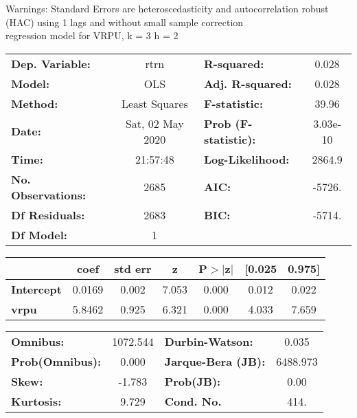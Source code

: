 Warnings: \newline
 [1] Standard Errors are heteroscedasticity and autocorrelation robust (HAC) using 1 lags and without small sample correction\\ 

regression model for VRPU, k = 3 h = 2\begin{center}
\begin{tabular}{lclc}
\toprule
\textbf{Dep. Variable:}    &       rtrn       & \textbf{  R-squared:         } &     0.028   \\
\textbf{Model:}            &       OLS        & \textbf{  Adj. R-squared:    } &     0.028   \\
\textbf{Method:}           &  Least Squares   & \textbf{  F-statistic:       } &     39.96   \\
\textbf{Date:}             & Sat, 02 May 2020 & \textbf{  Prob (F-statistic):} &  3.03e-10   \\
\textbf{Time:}             &     21:57:48     & \textbf{  Log-Likelihood:    } &    2864.9   \\
\textbf{No. Observations:} &        2685      & \textbf{  AIC:               } &    -5726.   \\
\textbf{Df Residuals:}     &        2683      & \textbf{  BIC:               } &    -5714.   \\
\textbf{Df Model:}         &           1      & \textbf{                     } &             \\
\bottomrule
\end{tabular}
\begin{tabular}{lcccccc}
                   & \textbf{coef} & \textbf{std err} & \textbf{z} & \textbf{P$> |$z$|$} & \textbf{[0.025} & \textbf{0.975]}  \\
\midrule
\textbf{Intercept} &       0.0169  &        0.002     &     7.053  &         0.000        &        0.012    &        0.022     \\
\textbf{vrpu}      &       5.8462  &        0.925     &     6.321  &         0.000        &        4.033    &        7.659     \\
\bottomrule
\end{tabular}
\begin{tabular}{lclc}
\textbf{Omnibus:}       & 1072.544 & \textbf{  Durbin-Watson:     } &    0.035  \\
\textbf{Prob(Omnibus):} &   0.000  & \textbf{  Jarque-Bera (JB):  } & 6488.973  \\
\textbf{Skew:}          &  -1.783  & \textbf{  Prob(JB):          } &     0.00  \\
\textbf{Kurtosis:}      &   9.729  & \textbf{  Cond. No.          } &     414.  \\
\bottomrule
\end{tabular}
\end{center}

